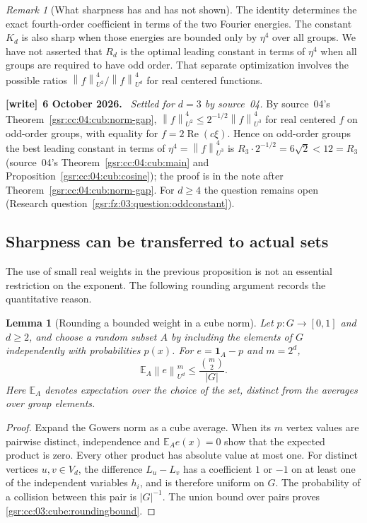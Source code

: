 \documentclass[11pt,letterpaper]{article}
\numberwithin{equation}{section}
\newtheorem{lemma}[theorem]{Lemma}
\theoremstyle{definition}
\theoremstyle{remark}
\newtheorem{remark}[theorem]{Remark}
\newcommand{\1}{\mathbf 1}
\newcommand{\norm}[1]{\left\|#1\right\|}
\newenvironment{writenote}[1][]{\par\smallskip\begingroup\small
 \noindent\textbf{[write]}\if\relax\detokenize{#1}\relax\else~\textbf{#1.}\fi\ }%
 {\par\endgroup\smallskip}
\begin{document}
\begin{remark}[What sharpness has and has not shown]
\label{gsr:cc:03:cube:sharpremark}
The identity determines the exact fourth-order coefficient in terms
of the two Fourier energies.  The constant $K_d$ is also sharp when
those energies are bounded only by $\eta^4$ over all groups.  We have
not asserted that $R_d$ is the optimal leading constant in terms of
$\eta^4$ when all groups are required to have odd order.  That separate
optimization involves the possible ratios
$\norm f_{U^2}^4/\norm f_{U^d}^4$ for real centered functions.
\end{remark}
\begin{writenote}[6 October 2026]
\emph{Settled for $d=3$ by source~04.} By source~04's Theorem~\ref{gsr:cc:04:cub:norm-gap}, $\norm f_{U^2}^4\le2^{-1/2}\norm f_{U^3}^4$ for real centered $f$ on odd-order groups, with equality for $f=2\operatorname{Re}(c\xi)$. Hence on odd-order groups the best leading constant in terms of $\eta^4=\norm f_{U^3}^4$ is $R_3\cdot2^{-1/2}=6\sqrt2<12=R_3$ (source~04's Theorem~\ref{gsr:cc:04:cub:main} and Proposition~\ref{gsr:cc:04:cub:cosine}); the proof is in the note after Theorem~\ref{gsr:cc:04:cub:norm-gap}. For $d\ge4$ the question remains open (Research question~\ref{gsr:fz:03:question:oddconstant}).
\end{writenote}

\subsection{Sharpness can be transferred to actual sets}

The use of small real weights in the previous proposition is not an
essential restriction on the exponent.  The following rounding
argument records the quantitative reason.

\begin{lemma}[Rounding a bounded weight in a cube norm]
\label{gsr:cc:03:cube:rounding}
Let $p:G\to[0,1]$ and $d\geq2$, and choose a random subset $A$ by
including the elements of $G$ independently with probabilities $p(x)$.
For $e=\1_A-p$ and $m=2^d$,
\begin{equation}
 \mathbb E_A\norm e_{U^d}^{m}
 \leq\frac{\binom m2}{|G|}.
 \label{gsr:cc:03:cube:roundingbound}
\end{equation}
Here $\mathbb E_A$ denotes expectation over the choice of the set,
distinct from the averages over group elements.
\end{lemma}

\begin{proof}
Expand the Gowers norm as a cube average.  When its $m$ vertex values
are pairwise distinct, independence and $\mathbb E_A e(x)=0$ show that
the expected product is zero.  Every other product has absolute value
at most one.  For distinct vertices $u,v\in V_d$, the difference
$L_u-L_v$ has a coefficient $1$ or $-1$ on at least one of the
independent variables $h_i$, and is therefore uniform on $G$.
The probability of a collision between this pair is $|G|^{-1}$.
The union bound over pairs proves \eqref{gsr:cc:03:cube:roundingbound}.
\end{proof}
\end{document}
